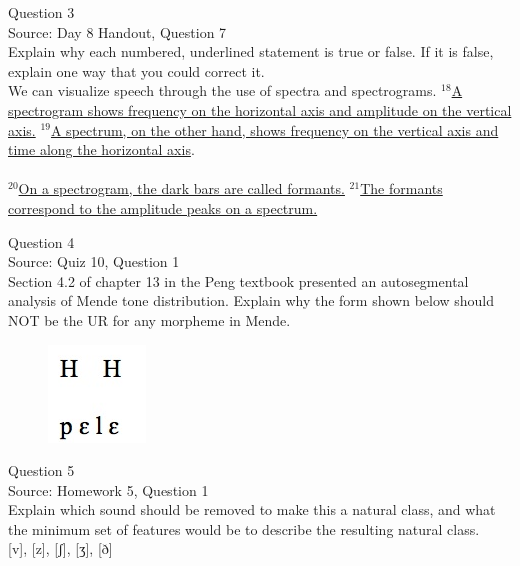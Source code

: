 \documentclass[12pt]{article}
\begin{document}
\newpage

{\large Question 3}\\

Source: Day 8 Handout, Question 7\\

Explain why each numbered, underlined statement is true or false. If it is false, explain one way that you could correct it.\\

We can visualize speech through the use of spectra and spectrograms. $^{18}$\ul{A spectrogram shows frequency on the horizontal axis and amplitude on the vertical axis.} $^{19}$\ul{A spectrum, on the other hand, shows frequency on the vertical axis and time along the horizontal axis}.\\\\$^{20}$\ul{On a spectrogram, the dark bars are called formants.} $^{21}$\ul{The formants correspond to the amplitude peaks on a spectrum.}


\newpage

{\large Question 4}\\

Source: Quiz 10, Question 1\\

Section 4.2 of chapter 13 in the Peng textbook presented an autosegmental analysis of Mende tone distribution. Explain why the form shown below should NOT be the UR for any morpheme in Mende.\\

\begin{figure}[H]
\includegraphics{../images/mende_house_b.png}
\end{figure}

\newpage

{\large Question 5}\\

Source: Homework 5, Question 1\\

Explain which sound should be removed to make this a natural class, and what the minimum set of features would be to describe the resulting natural class.\\

{[v]}, {[z]}, {[ʃ]}, {[ʒ]}, {[ð]}
\end{document}
